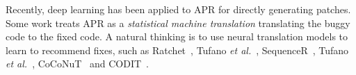 Recently, deep learning has
been applied to APR for directly generating patches.  
Some work treats APR as a {\em statistical machine translation} translating the buggy code to the fixed
code. A natural thinking is to use neural translation models to learn to recommend fixes, such as Ratchet~\cite{hata2018learning}, Tufano {\em et al.}~\cite{tufano2018empirical}, SequenceR~\cite{chen2018sequencer}, Tufano {\em et al.}~\cite{tufano2019learning}, CoCoNuT~\cite{lutellier2020coconut} and CODIT~\cite{CODIT}. 







